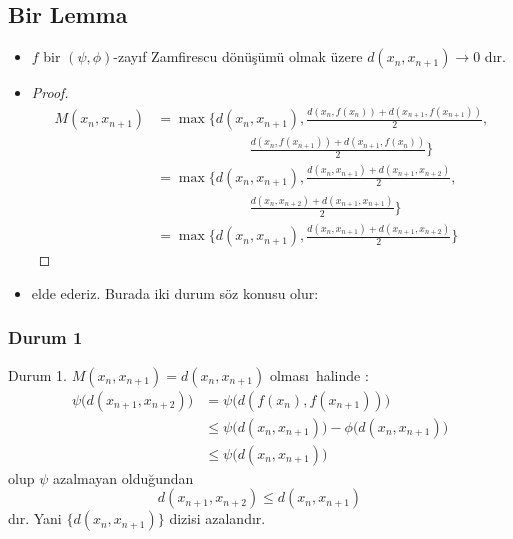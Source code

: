 \documentclass[8pt]{beamer}
\begin{document}
\subsection{Bir Lemma}
\begin{frame}
\begin{itemize}[<+-| alert@+>]  

  \item[] 
  \begin{lemma}
   $f$ bir $(\psi,\phi)$-zay\i f Zamfirescu d\"{o}n\"{u}\c{s}\"{u}m\"{u} olmak \"{u}zere $d(x_n,x_{n+1})\rightarrow 0$ d\i r.
  \end{lemma}

  \item[] 
    \begin{proof}
      \begin{align*}
          M(x_n,x_{n+1})&=\max\bigg\{
          d(x_n,x_{n+1}),\frac{d(x_n,f(x_n))+d(x_{n+1},f(x_{n+1}))}{2},\\
          &\hspace{80pt} \frac{d(x_n,f(x_{n+1}))+d(x_{n+1},f(x_{n}))}{2} \bigg\}\\
          &=\max\bigg\{
          d(x_n,x_{n+1}),\frac{d(x_n,x_{n+1})+d(x_{n+1},x_{n+2})}{2},\\
          &\hspace{80pt} \frac{d(x_n,x_{n+2})+d(x_{n+1},x_{n+1})}{2} \bigg\}\\
          &=\max\bigg\{
          d(x_n,x_{n+1}),\frac{d(x_n,x_{n+1})+d(x_{n+1},x_{n+2})}{2}\bigg\}
      \end{align*}
    \end{proof}

  \item[] elde ederiz. Burada iki durum s\"oz konusu olur:
\end{itemize}
\end{frame}%

\subsubsection{Durum 1}
\begin{frame}
  \begin{block}{Durum 1. $M(x_n,x_{n+1})=d(x_n,x_{n+1})$ olmas\i\ halinde :}
      \begin{align*}
          \psi\big(d(x_{n+1},x_{n+2})\big)&=\psi \big(d(f(x_{n}),f(x_{n+1}))\big)\\
          &\leq \psi\big(d(x_{n},x_{n+1})\big)- \phi\big(d(x_{n},x_{n+1})\big)\\
          &\leq \psi\big(d(x_{n},x_{n+1})\big)
      \end{align*}
olup $\psi$ azalmayan oldu\u{g}undan $$d(x_{n+1},x_{n+2})\leq d(x_n,x_{n+1})$$ d\i r. Yani $\{d(x_n,x_{n+1})\}$ dizisi azaland\i r.
   \end{block}
\end{frame}%
\end{document}
